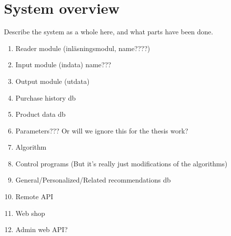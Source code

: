 
\section{System overview}\label{sec:res:sys}

Describe the system as a whole here, and what parts have been done.

\begin{enumerate}
    \item Reader module (inläsningsmodul, name????)
    \item Input module (indata) name???
    \item Output module (utdata)
    \item Purchase history db
    \item Product data db
    \item Parameters??? Or will we ignore this for the thesis work?
    \item Algorithm
    \item Control programs (But it's really just modifications of the algorithms)
    \item General/Personalized/Related recommendations db
    \item Remote API
    \item Web shop
    \item Admin web API?
\end{enumerate}





